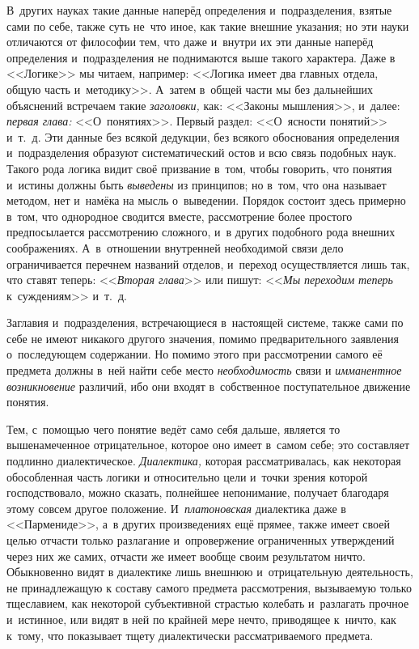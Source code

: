 В~других науках такие данные наперёд определения и~подразделения, взятые
сами по себе, также суть не~что иное, как такие внешние указания; но эти
науки отличаются от философии тем, что даже и~внутри их эти данные наперёд
определения и~подразделения не поднимаются выше такого характера. Даже в
<<Логике>> мы читаем, например: <<Логика имеет два главных отдела, общую часть
и~методику>>. А~затем в~общей части мы без дальнейших объяснений встречаем
такие {\em заголовки,} как: <<Законы мышления>>, и~далее:
{\em первая глава:} <<О~понятиях>>. Первый раздел: <<О~ясности понятий>>
и~т.~д. Эти данные без всякой дедукции, без всякого
обоснования определения и~подразделения образуют систематический остов и
всю связь подобных наук. Такого рода логика видит своё призвание в~том,
чтобы говорить, что понятия и~истины должны быть
{\em выведены} из принципов; но в~том, что она называет
методом, нет и~намёка на мысль о~выведении. Порядок состоит здесь примерно
в~том, что однородное сводится вместе, рассмотрение более простого
предпосылается рассмотрению сложного, и~в других подобного рода внешних
соображениях. А~в~отношении внутренней необходимой связи дело
ограничивается перечнем названий отделов, и~переход осуществляется лишь
так, что ставят теперь: <<{\em Вторая глава}>> или пишут:
<<{\em Мы переходим теперь} к~суждениям>> и~т.~д.

Заглавия и~подразделения, встречающиеся в~настоящей системе, также сами по
себе не имеют никакого другого значения, помимо предварительного заявления
о~последующем содержании. Но помимо этого при рассмотрении самого её
предмета должны в~ней найти себе место {\em необходимость} связи и
{\em имманентное возникновение} различий, ибо они
входят в~собственное поступательное движение понятия.

Тем, с~помощью чего понятие ведёт само себя дальше, является то
вышенамеченное отрицательное, которое оно имеет в~самом себе; это
составляет подлинно диалектическое. {\em Диалектика,}
которая рассматривалась, как некоторая обособленная часть логики и
относительно цели и~точки зрения которой господствовало, можно сказать,
полнейшее непонимание, получает благодаря этому совсем другое положение.
И~{\em платоновская} диалектика даже в <<Пармениде>>, а~в
других произведениях ещё прямее, также имеет своей целью отчасти только
разлагание и~опровержение ограниченных утверждений через них же самих,
отчасти же имеет вообще своим результатом ничто. Обыкновенно видят в
диалектике лишь внешнюю и~отрицательную деятельность, не принадлежащую к
составу
самого предмета рассмотрения, вызываемую только тщеславием, как некоторой
субъективной страстью колебать и~разлагать прочное и~истинное, или видят в
ней по крайней мере нечто, приводящее к~ничто, как к~тому, что показывает
тщету диалектически рассматриваемого предмета.

